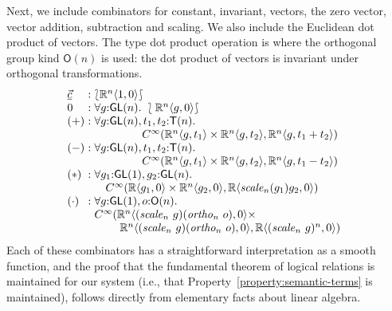 \documentclass[preprint]{sigplanconf}
\newcommand{\typeOfCartSp}[1]{\lbag #1 \rbag}
\theoremstyle{examplestyle}
\begin{document}
Next, we include combinators for constant, invariant, vectors, the
zero vector, vector addition, subtraction and scaling. We also include
the Euclidean dot product of vectors. The type dot product operation
is where the orthogonal group kind $\mathsf{O}(n)$ is used: the dot
product of vectors is invariant under orthogonal transformations.
\begin{displaymath}
  \begin{array}{l@{\hspace{0.3em}}c@{\hspace{0.3em}}l}
    \underline{\vec{c}} &:& \typeOfCartSp{\mathbb{R}^n\langle 1, 0 \rangle} \\
    0 &:& \forall g \mathord: \mathsf{GL}(n).~\typeOfCartSp{\mathbb{R}^n\langle g, 0 \rangle} \\
    (+) &:&
    \begin{array}[t]{@{}l}
      \forall g \mathord: \mathsf{GL}(n), t_1,t_2 \mathord: \mathsf{T}(n). \\
      \hspace{1.5cm} C^\infty(\mathbb{R}^n\langle g, t_1 \rangle \times \mathbb{R}^n\langle g, t_2 \rangle, \mathbb{R}^n\langle g, t_1 + t_2 \rangle)\\
    \end{array} \\
    (-) &:&
    \begin{array}[t]{@{}l}
      \forall g \mathord: \mathsf{GL}(n), t_1,t_2 \mathord: \mathsf{T}(n). \\
      \hspace{1.5cm} C^\infty(\mathbb{R}^n\langle g, t_1 \rangle \times \mathbb{R}^n\langle g, t_2 \rangle, \mathbb{R}^n\langle g, t_1 - t_2 \rangle)\\
    \end{array} \\
    (*) &:&
    \begin{array}[t]{@{}l}
      \forall g_1 \mathord: \mathsf{GL}(1), g_2 \mathord: \mathsf{GL}(n).\\
      \quad C^\infty(\mathbb{R}\langle g_1, 0 \rangle \times \mathbb{R}^n\langle g_2, 0\rangle, \mathbb{R}\langle \mathit{scale}_n(g_1)g_2, 0 \rangle)
    \end{array}
    \\
    (\cdot) &:& 
    \begin{array}[t]{@{}l}
      \forall g \mathord: \mathsf{GL}(1), o \mathord: \mathsf{O}(n).~\\
      C^\infty(\mathbb{R}^n\langle (\mathit{scale}_n~g)(\mathit{ortho}_n~o), 0 \rangle \times \\
      \quad\quad\; \mathbb{R}^n\langle (\mathit{scale}_n~g)(\mathit{ortho}_n~o), 0\rangle, \mathbb{R}\langle (\mathit{scale}_n~g)^n, 0 \rangle)
    \end{array}
  \end{array}
\end{displaymath}
Each of these combinators has a straightforward interpretation as a
smooth function, and the proof that the fundamental theorem of logical
relations is maintained for our system (i.e., that
Property~\ref{property:semantic-terms} is maintained), follows
directly from elementary facts about linear algebra.
\end{document}
